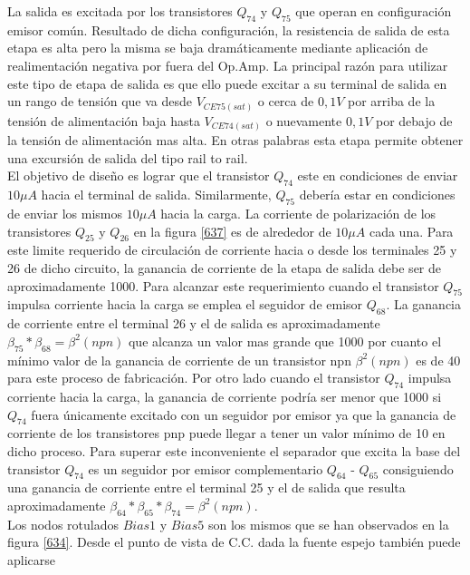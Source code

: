 \documentclass[12pt,a4paper,final,headinclude,footinclude,BCOR5mm]{scrartcl}
\begin{document}
La salida es excitada por los transistores $Q_{74}$ y $Q_{75}$ que operan en configuración emisor común. Resultado de dicha configuración, la resistencia de salida de esta etapa es alta pero la misma se baja dramáticamente mediante aplicación de realimentación negativa por fuera del Op.Amp. La principal razón para utilizar este tipo de etapa de salida es que ello puede excitar a su terminal de salida en un rango de tensión que va desde $V_{CE75(sat)}$ o cerca de $0,1 V$ por arriba de la tensión de alimentación baja hasta $V_{CE74(sat)}$ o nuevamente $0,1 V$ por debajo de la tensión de alimentación mas alta. En otras palabras esta etapa permite obtener una excursión de salida del tipo rail to rail.\\

El objetivo de diseño es lograr que el transistor $Q_{74}$ este en condiciones de enviar $10 \mu A$ hacia el terminal de salida. Similarmente, $Q_{75}$ debería estar en condiciones de enviar los mismos $10 \mu A$ hacia la carga. La corriente de polarización de los transistores $Q_{25}$ y $Q_{26}$ en la figura \ref{637} es de alrededor de $10 \mu A$ cada una. Para este limite requerido de circulación de corriente hacia o desde los terminales 25 y 26 de dicho circuito, la ganancia de corriente de la etapa de salida debe ser de aproximadamente 1000. Para alcanzar este requerimiento cuando el transistor $Q_{75}$ impulsa corriente hacia la carga se emplea el seguidor de emisor $Q_{68}$. La ganancia de corriente entre el terminal 26 y el de salida es aproximadamente $\beta_{75}*\beta_{68} = \beta^{2}(npn)$ que alcanza un valor mas grande que 1000 por cuanto el mínimo valor de la ganancia de corriente de un transistor npn $\beta^{2}(npn)$ es de 40 para este proceso de fabricación. Por otro lado cuando el transistor $Q_{74}$ impulsa corriente hacia la carga, la ganancia de corriente podría ser menor que 1000 si $Q_{74}$ fuera únicamente excitado con un seguidor por emisor ya que la ganancia de corriente de los transistores pnp puede llegar a tener un valor mínimo de 10 en dicho proceso. Para superar este inconveniente el separador que excita la base del transistor $Q_{74}$ es un seguidor por emisor complementario $Q_{64}$ - $Q_{65}$ consiguiendo una ganancia de corriente entre el terminal 25 y el de salida que resulta aproximadamente $\beta_{64}*\beta_{65}*\beta_{74} = \beta^{2}(npn)$.\\

Los nodos rotulados $Bias1$ y $Bias5$ son los mismos que se han observados en la figura \ref{634}. Desde el punto de vista de C.C. dada la fuente espejo también puede aplicarse
\end{document}
